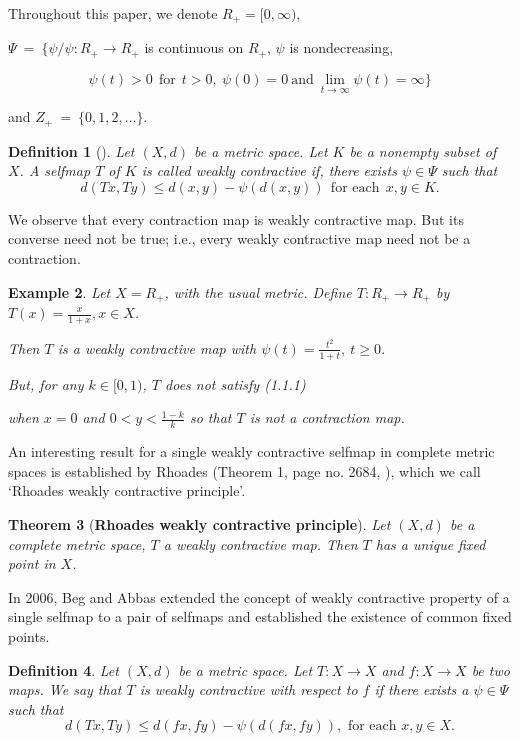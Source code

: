 \documentclass[11]{article}
\newtheorem{definition}{Definition}[section]
\newtheorem{theorem}[definition]{Theorem}
\newtheorem{example}[definition]{Example}
\numberwithin{equation}{definition}
\begin{document}
Throughout this paper, we denote $R_{+}=[0,\infty)$,

$\Psi\ =\ \{\psi/\psi:R_{+}\to R_{+}$ is continuous on $R_{+}$, $\psi$ is nondecreasing,

\[\psi(t)>0\ \ \text{for}\ \ t>0,\ \psi(0)=0\ \text{and}\ \lim_{t\to\infty}\psi(t )=\infty\}\]

and $Z_{+}\ =\ \{0,1,2,\ldots\}$.

\begin{definition}[\cite{Rhoades2001}]
Let $(X,d)$ be a metric space. Let $K$ be a nonempty subset of $X$. A selfmap $T$ of $K$ is called \emph{weakly contractive} if, there exists $\psi\in\Psi$ such that
\[d(Tx,Ty)\leq d(x,y)-\psi(d(x,y))\ \ \text{for each}\ \ x,y\in K.\]
\end{definition}

We observe that every contraction map is weakly contractive map. But its converse need not be true; i.e., every weakly contractive map need not be a contraction.

\begin{example}
Let $X=R_{+}$, with the usual metric. Define $T:R_{+}\to R_{+}$ by $T(x)=\frac{x}{1+x},x\in X$.

Then $T$ is a weakly contractive map with $\psi(t)=\frac{t^{2}}{1+t},\ t\geq 0$.

But, for any $k\in[0,1)$, $T$ does not satisfy (1.1.1)

when $x=0$ and $0<y<\frac{1-k}{k}$ so that $T$ is not a contraction map.
\end{example}

An interesting result for a single weakly contractive selfmap in complete metric spaces is established by Rhoades (Theorem 1, page no. 2684, \cite{Rhoades2001}), which we call `Rhoades weakly contractive principle'.

\begin{theorem}[\textbf{Rhoades weakly contractive principle}]
Let $(X,d)$ be a complete metric space, $T$ a weakly contractive map. Then $T$ has a unique fixed point in $X$.
\end{theorem}

In 2006, Beg and Abbas \cite{Beg2006} extended the concept of weakly contractive property of a single selfmap to a pair of selfmaps and established the existence of common fixed points.





\begin{definition}
Let $(X,d)$ be a metric space. Let $T:X\to X$ and $f:X\to X$ be two maps. We say that $T$ \emph{is weakly contractive with respect to $f$} if there exists a $\psi\in\Psi$ such that
\begin{equation}
d(Tx,Ty)\leq d(fx,fy)-\psi(d(fx,fy)),\text{ for each }x,y\in X.
\end{equation}
\end{definition}
\end{document}

